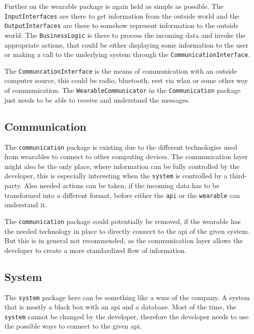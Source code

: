 Further on the wearable package is again held as simple as possible. The \texttt{InputInterfaces} are there to get information from the outside world and the \texttt{OutputInterfaces} are there to somehow represent information to the outside world. The \texttt{BusinessLogic} is there to process the incoming data and invoke the appropriate actions, that could be either displaying some information to the user or making a call to the underlying system through the \texttt{CommunicationInterface}.

The \texttt{CommuncationInterface} is the means of communication with an outside computer source, this could be radio, bluetooth, \gls{rest} via \gls{wlan} or some other way of communication. The \texttt{WearableCommunicator} in the \texttt{Communication} package just needs to be able to receive and understand the messages.
\subsection{Communication}
The \texttt{communication} package is existing due to the different technologies used from \gls{wearable}s to connect to other computing devices. The communication layer might also be the only place, where information can be fully controlled by the developer, this is especially interesting when the \texttt{system} is controlled by a third-party. Also needed actions can be taken, if the incoming data has to be transformed into a different format, before either the \texttt{\gls{api}} or the \texttt{wearable} can understand it. 

The \texttt{communication} package could potentially be removed, if the wearable has the needed technology in place to directly connect to the \gls{api} of the given system. But this is in general not recommended, as the communication layer allows the developer to create a more standardized flow of information.

\subsection{System}
The \texttt{system} package here can be something like a \gls{wms} of the company. A system that is mostly a black box with an \gls{api} and a database. Most of the time, the \texttt{system} cannot be changed by the developer, therefore the developer needs to use the possible ways to connect to the given \gls{api}.


